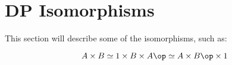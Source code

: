 

\section{DP Isomorphisms}

\begin{publictodo}
    This section will describe some of the isomorphisms, such as:

    \begin{equation}
        A \times B \simeq 1 \times B \times A\op \simeq A \times B\op \times 1
    \end{equation}

\end{publictodo}

